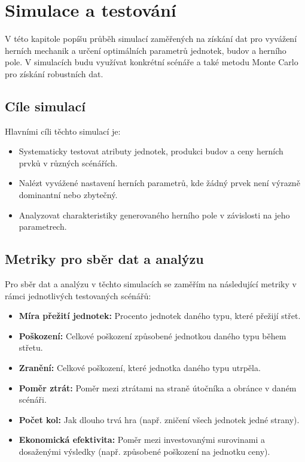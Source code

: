 \section{Simulace a testování}

V této kapitole popíšu průběh simulací zaměřených na získání dat pro vyvážení herních mechanik a určení optimálních parametrů jednotek, budov a herního pole. V simulacích budu využívat konkrétní scénáře a také metodu Monte Carlo pro získání robustních dat.

\subsection{Cíle simulací}

Hlavními cíli těchto simulací je:

\begin{itemize}
\item Systematicky testovat atributy jednotek, produkci budov a ceny herních prvků v různých scénářích.
\item Nalézt vyvážené nastavení herních parametrů, kde žádný prvek není výrazně dominantní nebo zbytečný.
\item Analyzovat charakteristiky generovaného herního pole v závislosti na jeho parametrech.
\end{itemize}

\subsection{Metriky pro sběr dat a analýzu}

Pro sběr dat a analýzu v těchto simulacích se zaměřím na následující metriky v rámci jednotlivých testovaných scénářů:

\begin{itemize}
\item \textbf{Míra přežití jednotek:} Procento jednotek daného typu, které přežijí střet.
\item \textbf{Poškození:} Celkové poškození způsobené jednotkou daného typu během střetu.
\item \textbf{Zranění:} Celkové poškození, které jednotka daného typu utrpěla.
\item \textbf{Poměr ztrát:} Poměr mezi ztrátami na straně útočníka a obránce v daném scénáři.
\item \textbf{Počet kol:} Jak dlouho trvá hra (např. zničení všech jednotek jedné strany).
\item \textbf{Ekonomická efektivita:} Poměr mezi investovanými surovinami a dosaženými výsledky (např. způsobené poškození na jednotku ceny).
\end{itemize}

